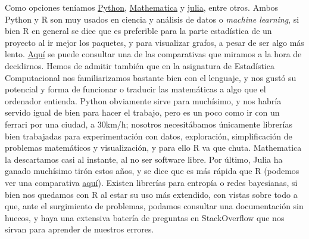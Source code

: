 Como opciones teníamos \href{https://www.python.org/}{Python}, 
\href{https://www.wolfram.com/mathematica/}{Mathematica} y \href{https://julialang.org/}{julia}, entre otros. 
Ambos Python y R son muy usados en ciencia y análisis de datos o \textit{machine learning}, si bien R en general 
se dice que es preferible para la parte estadística de un proyecto al ir mejor los paquetes, y para visualizar 
grafos, a pesar de ser algo más lento. \href{https://www.interviewbit.com/blog/python-vs-r/}{Aquí} se puede 
consultar una de las comparativas que miramos a la hora de decidirnos. Hemos de admitir también que en la 
asignatura de Estadística Computacional nos familiarizamos bastante bien con el lenguaje, y nos gustó su 
potencial y forma de funcionar o traducir las matemáticas a algo que el ordenador entienda. Python obviamente 
sirve para muchísimo, y nos habría servido igual de bien para hacer el trabajo, pero es un poco 
como ir con un ferrari por una ciudad, a 30km/h; nosotros necesitábamos 
únicamente librerías bien trabajadas para experimentación con datos, exploración, simplificación de problemas 
matemáticos y visualización, y para ello R va que chuta. Mathematica la descartamos casi al instante, al no ser 
software libre. Por último, Julia ha ganado muchísimo tirón estos años, y se dice que es más rápida que R (podemos ver 
una comparativa \href{https://stackshare.io/stackups/julia-vs-r-language}{aquí}). Existen 
librerías para entropía o redes bayesianas, si bien nos quedamos con R al estar su uso más extendido, con 
vistas sobre todo a que, ante el surgimiento de problemas, podamos consultar una documentación sin huecos, 
y haya una extensiva batería de preguntas en StackOverflow que nos sirvan para aprender de nuestros errores.

